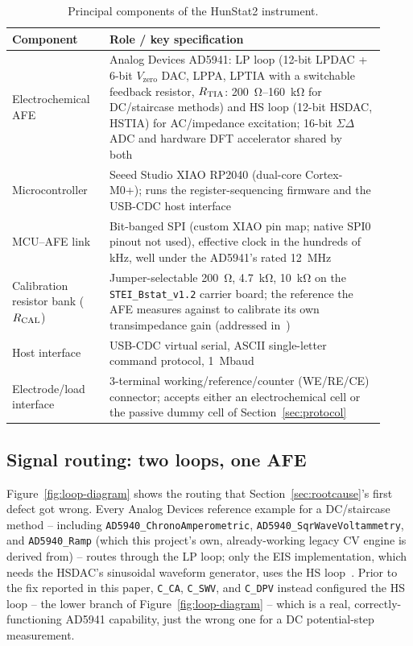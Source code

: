 \begin{table}[h]
\centering
\footnotesize
\setlength{\tabcolsep}{4pt}
\caption{Principal components of the HunStat2 instrument.}
\label{tab:components}
\begin{threeparttable}
\begin{tabular}{@{}p{0.24\linewidth}p{0.68\linewidth}@{}}
\toprule
Component & Role / key specification \\
\midrule
Electrochemical AFE & Analog Devices AD5941: LP loop (12-bit LPDAC + 6-bit
  $V_{\mathrm{zero}}$ DAC, LPPA, LPTIA with a switchable feedback resistor,
  $R_{\mathrm{TIA}}$: \SI{200}{\ohm}--\SI{160}{\kilo\ohm} for DC/staircase methods) and
  HS loop (12-bit HSDAC, HSTIA) for AC/impedance excitation; 16-bit
  $\Sigma\Delta$ ADC and hardware DFT accelerator shared by
  both~\cite{devices2024ad5940} \\
Microcontroller & Seeed Studio XIAO RP2040 (dual-core Cortex-M0+); runs
  the register-sequencing firmware and the USB-CDC host interface \\
MCU--AFE link & Bit-banged SPI (custom XIAO pin map; native SPI0 pinout
  not used), effective clock in the hundreds of kHz, well under the
  AD5941's rated \SI{12}{\mega\hertz}~\cite{devices2024ad5940} \\
Calibration resistor bank ($R_{\mathrm{CAL}}$) & Jumper-selectable \SI{200}{\ohm},
  \SI{4.7}{\kilo\ohm}, \SI{10}{\kilo\ohm} on the \texttt{STEI\_Bstat\_v1.2}
  carrier board; the reference the AFE measures against to calibrate its
  own transimpedance gain (addressed in~\cite{clement2026linearity}) \\
Host interface & USB-CDC virtual serial, ASCII single-letter command
  protocol, \SI{1}{\mega baud} \\
Electrode/load interface & 3-terminal working/reference/counter (WE/RE/CE)
  connector; accepts either an electrochemical cell or the passive dummy
  cell of Section~\ref{sec:protocol} \\
\bottomrule
\end{tabular}
\end{threeparttable}
\end{table}

\subsection{Signal routing: two loops, one AFE}
\label{sec:loop-diagram}
Figure~\ref{fig:loop-diagram} shows the routing that
Section~\ref{sec:rootcause}'s first defect got wrong. Every Analog
Devices reference example for a DC/staircase method -- including
\texttt{AD5940\_ChronoAmperometric}, \texttt{AD5940\_SqrWaveVoltammetry},
and \texttt{AD5940\_Ramp} (which this project's own, already-working
legacy CV engine is derived from) -- routes through the LP loop; only the
EIS implementation, which needs the HSDAC's sinusoidal waveform generator,
uses the HS loop~\cite{ad5940_examples_github}. Prior to the fix reported
in this paper, \texttt{C\_CA}, \texttt{C\_SWV}, and \texttt{C\_DPV}
instead configured the HS loop -- the lower branch of
Figure~\ref{fig:loop-diagram} -- which is a real, correctly-functioning
AD5941 capability, just the wrong one for a DC potential-step measurement.

